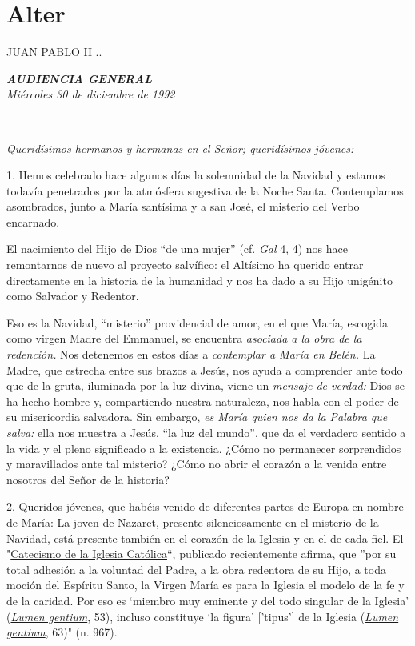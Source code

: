 \section{Alter}
JUAN PABLO II ..

\emph{\textbf{AUDIENCIA GENERAL}}\\[2\baselineskip]\emph{Miércoles 30 de
	diciembre de 1992}

~

\emph{Queridísimos hermanos y hermanas en el Señor; queridísimos
	jóvenes:}

1. Hemos celebrado hace algunos días la solemnidad de la Navidad y
estamos todavía penetrados por la atmósfera sugestiva de la Noche Santa.
Contemplamos asombrados, junto a María santísima y a san José, el
misterio del Verbo encarnado.

El nacimiento del Hijo de Dios ``de una mujer'' (cf. \emph{Gal} 4, 4)
nos hace remontarnos de nuevo al proyecto salvífico: el Altísimo ha
querido entrar directamente en la historia de la humanidad y nos ha dado
a su Hijo unigénito como Salvador y Redentor.

Eso es la Navidad, ``misterio'' providencial de amor, en el que María,
escogida como virgen Madre del Emmanuel, se encuentra \emph{asociada a
	la obra de la redención.} Nos detenemos en estos días a \emph{contemplar
	a María en Belén.} La Madre, que estrecha entre sus brazos a Jesús, nos
ayuda a comprender ante todo que de la gruta, iluminada por la luz
divina, viene un \emph{mensaje de verdad:} Dios se ha hecho hombre y,
compartiendo nuestra naturaleza, nos habla con el poder de su
misericordia salvadora. Sin embargo, \emph{es María quien nos da la
	Palabra que salva:} ella nos muestra a Jesús, ``la luz del mundo'', que
da el verdadero sentido a la vida y el pleno significado a la
existencia. ¿Cómo no permanecer sorprendidos y maravillados ante tal
misterio? ¿Cómo no abrir el corazón a la venida entre nosotros del Señor
de la historia?

2. Queridos jóvenes, que habéis venido de diferentes partes de Europa en
nombre de María: La joven de Nazaret, presente silenciosamente en el
misterio de la Navidad, está presente también en el corazón de la
Iglesia y en el de cada fiel. El
"\href{http://www.vatican.va/archive/catechism_sp/index_sp.html}{Catecismo
	de la Iglesia Católica}``, publicado recientemente afirma, que ''por su
total adhesión a la voluntad del Padre, a la obra redentora de su Hijo,
a toda moción del Espíritu Santo, la Virgen María es para la Iglesia el
modelo de la fe y de la caridad. Por eso es `miembro muy eminente y del
todo singular de la Iglesia'
(\emph{\href{http://www.vatican.va/archive/hist_councils/ii_vatican_council/documents/vat-ii_const_19641121_lumen-gentium_sp.html}{Lumen
		gentium}}, 53), \emph{} incluso constituye `la figura' {[}'tipus'{]} de
la Iglesia
(\emph{\href{http://www.vatican.va/archive/hist_councils/ii_vatican_council/documents/vat-ii_const_19641121_lumen-gentium_sp.html}{Lumen
		gentium}}, 63)" (n. 967).

